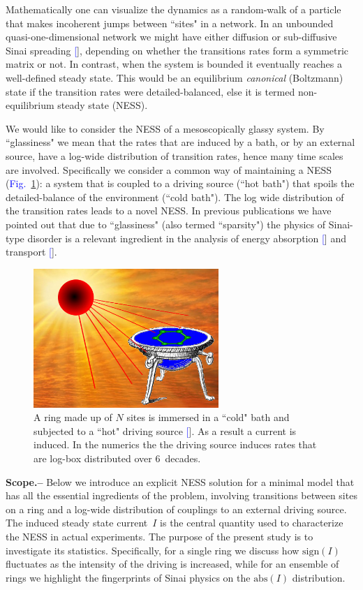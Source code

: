 \documentclass[aps,prl,floats,floatfix,twocolumn]{revtex4}
\newcommand{\sect}[1]{{\bf #1.-- }}
\newcommand{\Fig}[1]{\textcolor{blue}{Fig.}\!\!~\ref{#1}}
\renewcommand{\cite}[1]{\textcolor{blue}{[\onlinecite{#1}}]} %
\begin{document}
Mathematically one can visualize the dynamics as a random-walk 
of a particle that makes incoherent jumps between ``sites" in a network.
In an unbounded quasi-one-dimensional network we might have either diffusion 
or sub-diffusive Sinai spreading \cite{sinai}, depending on whether the transitions rates 
form a symmetric matrix or not. In contrast, when the system is bounded 
it eventually reaches a well-defined steady state. 
This would be an equilibrium {\em canonical} (Boltzmann) state if the transition rates 
were detailed-balanced, else it is termed non-equilibrium steady state (NESS). 

We would like to consider the NESS of a mesoscopically glassy system.
By ``glassiness" we mean that the rates that are induced by a bath, 
or by an external source, have a log-wide distribution of transition rates, 
hence many time scales are involved. 
Specifically we consider a common way of maintaining a NESS (\Fig{f0}):
a system that is coupled to a driving source (``hot bath") 
that spoils the detailed-balance of the environment (``cold bath"). 
The log wide distribution of the transition rates leads to a novel NESS.
% 
In previous publications we have pointed out that due to ``glassiness" 
(also termed ``sparsity") the physics of Sinai-type disorder is 
a relevant ingredient in the analysis of energy absorption \cite{kbb} 
and transport \cite{ner}.  
   

\begin{figure}
\includegraphics[width=7cm]{SunBath}
\caption{
A ring made up of $N$ sites is immersed in a ``cold" bath 
and subjected to a ``hot" driving source \cite{images}. 
As a result a current is induced.  
%
In the numerics the the driving source induces 
rates that are log-box distributed over 6~decades. 
} 
\label{f0}
\end{figure}



\sect{Scope}
%
% 
Below we introduce an explicit NESS solution for a minimal model that 
has all the essential ingredients of the problem, involving transitions between sites on a ring 
and a log-wide distribution of couplings to an external driving source. 
The induced steady state current~$I$ is the central quantity used to characterize 
the NESS in actual experiments. The purpose of the present study is to investigate 
its statistics. Specifically, for a single ring we discuss how $\text{sign}(I)$ fluctuates    
as the intensity of the driving is increased, while for an ensemble 
of rings we highlight the fingerprints of Sinai physics on the $\text{abs}(I)$ distribution.  
\end{document}
